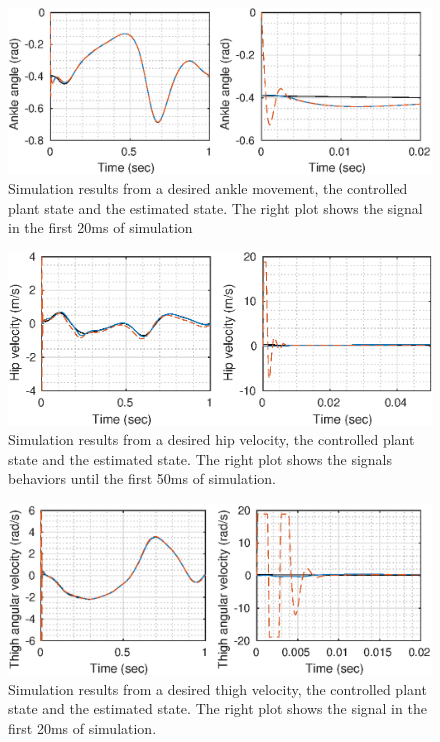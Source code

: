 \documentclass[letterpaper, 10 pt, conference]{ieeeconf}  %
\theoremstyle{plain}
\theoremstyle{definition}
\theoremstyle{remark}
\begin{document}
%
%
\begin{figure}[h!]
	\begin{center}
	\includegraphics[width = \columnwidth]{Figs/q_ankle_mu_fix_1e-03.eps}
	\caption{ Simulation results from a desired ankle movement, the controlled plant state and the estimated state. The right plot shows the signal in the first 20ms of simulation}
	\label{fig:ankle}
	\end{center}
\end{figure}
%
%
%
%
\begin{figure}[h!]
	\begin{center}
	\includegraphics[width = \columnwidth]{Figs/dq_hip_mu_fix_1e-03.eps}
	\caption{ Simulation results from a desired hip velocity, the controlled plant state and the estimated state. The right plot shows the signals behaviors until the first 50ms of simulation.}
	\label{fig:dhip}
	\end{center}
\end{figure}
%
%
\begin{figure}[h!]
	\begin{center}
	\includegraphics[width = \columnwidth]{Figs/dq_thigh_mu_fix_1e-03.eps}
	\caption{Simulation results from a desired thigh velocity, the controlled plant state and the estimated state. The right plot shows the signal in the first 20ms of simulation.}
	\label{fig:dthigh}
	\end{center}
\end{figure}
\end{document}

